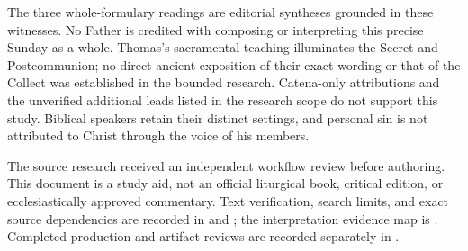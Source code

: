 The three whole-formulary readings are editorial syntheses grounded in these witnesses. No Father is credited with composing or interpreting this precise Sunday as a whole. Thomas's sacramental teaching illuminates the Secret and Postcommunion; no direct ancient exposition of their exact wording or that of the Collect was established in the bounded research. Catena-only attributions and the unverified additional leads listed in the research scope do not support this study. Biblical speakers retain their distinct settings, and personal sin is not attributed to Christ through the voice of his members.

The source research received an independent workflow review before authoring. This document is a study aid, not an official liturgical book, critical edition, or ecclesiastically approved commentary. Text verification, search limits, and exact source dependencies are recorded in  and ; the interpretation evidence map is . Completed production and artifact reviews are recorded separately in .

